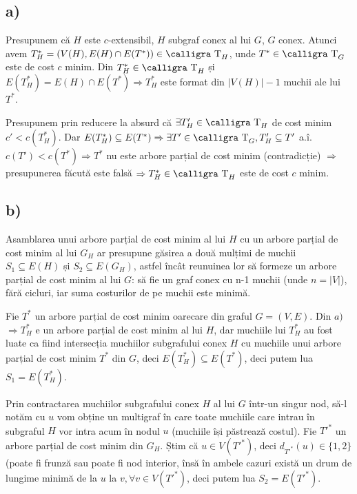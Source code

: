 \documentclass[a4paper,12pt]{article}
\begin{document}
\subsection{a)}

Presupunem că $H$ este $c$-extensibil, $H$ subgraf conex al lui $G$, $G$ conex. Atunci avem $T^*_H = \left(V(H), E(H) \cap E(T^*)\right) \in \text{{\calligra T}}_H$, unde $T^* \in \text{{\calligra T}}_G$ este de cost $c$ minim. Din $T^*_H\in \text{{\calligra T}}_H$ și $E(T^*_H)=E(H)\cap E(T^*) \Rightarrow T^*_H$ este format din $|V(H)|-1$ muchii ale lui $T^*$.

Presupunem prin reducere la absurd că $\exists T'_H \in \text{{\calligra T}}_H$ de cost minim $c' < c(T^*_H)$. Dar $E(T^*_H) \subseteq E(T^*) \Rightarrow \exists T' \in \text{{\calligra T}}_G, T'_H \subseteq T'$ a.î.  $c(T') < c(T^*) \Rightarrow T^*$ nu este arbore parțial de cost minim (contradicție) $\Rightarrow$ presupunerea făcută este falsă $\Rightarrow T^*_H \in \text{{\calligra T}}_H$ este de cost $c$ minim.

\subsection{b)}

Asamblarea unui arbore parțial de cost minim al lui $H$ cu un arbore parțial de cost minim al lui $G_{H}$ ar presupune găsirea a două mulțimi de muchii $S_1 \subseteq E(H)$  și $S_2 \subseteq E(G_{H})$, astfel încât reunuinea lor să formeze un arbore parțial de cost minim al lui $G$: să fie un graf conex cu n-1 muchii (unde $n=|V|$), fără cicluri, iar suma costurilor de pe muchii este minimă.

Fie $T^{*}$ un arbore parțial de cost minim oarecare din graful $G=(V,E)$. Din $a)$ $\Rightarrow T_{H}^{*}$ e un arbore parțial de cost minim al lui $H$, dar muchiile lui $T_{H}^{*}$ au fost luate ca fiind intersecția muchiilor subgrafului conex $H$ cu muchiile unui arbore parțial de cost minim $T^{*}$ din $G$, deci $E(T_{H}^{*}) \subseteq E(T^{*})$, deci putem lua $S_1 = E(T_{H}^{*})$.

Prin contractarea muchiilor subgrafului conex $H$ al lui $G$ într-un singur nod, să-l notăm cu $u$ vom obține un multigraf în care toate muchiile care intrau în subgraful $H$ vor intra acum în nodul $u$ (muchiile își păstrează costul). Fie $T'^{*}$ un arbore parțial de cost minim din $G_{H}$. Știm că $u \in V(T'^{*})$, deci $d_{T'^{*}}(u) \in \{1,2\}$ (poate fi frunză sau poate fi nod interior, însă în ambele cazuri există un drum de lungime minimă de la $u$ la $v, \forall v \in V(T'^{*})$, deci putem lua $S_2 = E(T'^{*})$.
\end{document}
